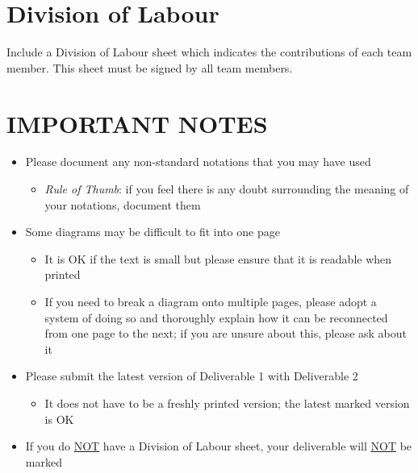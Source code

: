 \documentclass[]{article}
\begin{document}
\appendix
\section{Division of Labour}
\label{sec:division_of_labour}
Include a Division of Labour sheet which indicates the contributions of each team member. This sheet must be signed by all team members.

\newpage
\section*{IMPORTANT NOTES}
\begin{itemize}
	\item Please document any non-standard notations that you may have used
	\begin{itemize}
		\item \emph{Rule of Thumb}: if you feel there is any doubt surrounding the meaning of your notations, document them
	\end{itemize}
	\item Some diagrams may be difficult to fit into one page
	\begin{itemize}
		\item It is OK if the text is small but please ensure that it is readable when printed
		\item If you need to break a diagram onto multiple pages, please adopt a system of doing so and thoroughly explain how it can be reconnected from one page to the next; if you are unsure about this, please ask about it
	\end{itemize}
	\item Please submit the latest version of Deliverable 1 with Deliverable 2
	\begin{itemize}
		\item It does not have to be a freshly printed version; the latest marked version is OK
	\end{itemize}
	\item If you do \underline{NOT} have a Division of Labour sheet, your deliverable will \underline{NOT} be marked
\end{itemize}
\end{document}
